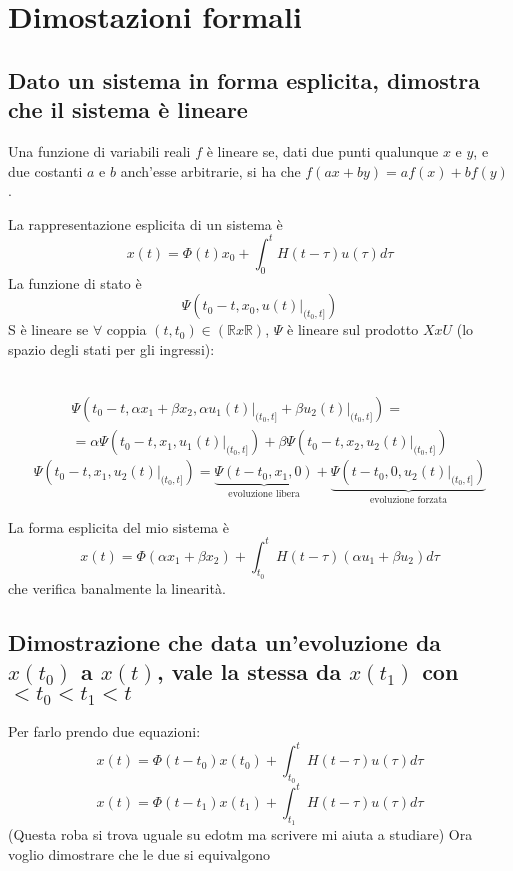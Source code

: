 \documentclass{article}
\begin{document}
\section{Dimostazioni formali}

\subsection{Dato un sistema in forma esplicita, dimostra che il sistema è lineare}
Una funzione di variabili reali $f$ è lineare se, dati due punti qualunque
$x$ e $y$, e due costanti $a$ e $b$ anch'esse arbitrarie, si ha che $f(ax+by)=af(x)+bf(y)$.

La rappresentazione esplicita di un sistema è 
\[ x(t) = \Phi(t)x_0 +\int_{0}^{t} H(t-\tau) u(\tau) d \tau
\]
La funzione di stato è
\[ \Psi \left(t_0-t,x_0,\left.u(t)\right|_{(t_0,t]}\right) \]
S è lineare se $\forall$ coppia $(t,t_0) \in (\mathbb{R}x\mathbb{R})$, $\Psi$ è lineare sul prodotto $XxU$ 
(lo spazio degli stati per gli ingressi):

\
\begin{align*}
    \Psi \left(t_0-t,\alpha x_1+\beta x_2,\alpha\left.u_1(t)\right|_{(t_0,t]}+\beta\left.u_2(t)\right|_{(t_0,t]}\right) =\\
    = \alpha\Psi \left(t_0-t,x_1,\left.u_1(t)\right|_{(t_0,t]}\right)+\beta\Psi \left(t_0-t,x_2,\left.u_2(t)\right|_{(t_0,t]}\right)
\end{align*}
\[
    \Psi \left(t_0-t,x_1,\left.u_2(t)\right|_{(t_0,t]}\right)  = \underbrace{\Psi\left(t-t_0,x_1,0\right)}_{\text{evoluzione libera}}+
    \underbrace{\Psi\left(t-t_0,0,\left.u_2(t)\right|_{(t_0,t]}\right)}_{\text{evoluzione forzata}}
\]

La forma esplicita del mio sistema è 
\[
x(t) = \Phi(\alpha x_1+\beta x_2) + \int_{t_0}^{t} H(t-\tau)(\alpha u_1 +\beta u_2)d\tau    
\]
che verifica banalmente la linearità.


\subsection{\boldmath Dimostrazione che data un'evoluzione da $x(t_0)$ a $x(t)$, vale la stessa da $x(t_1)$ con $<t_0<t_1<t$}
Per farlo prendo due equazioni:
\begin{equation}
    x(t) = \Phi(t-t_0)x(t_0)+\int_{t_0}^{t} H(t-\tau)u(\tau)d\tau
\end{equation}
\begin{equation}
    x(t) = \Phi(t-t_1)x(t_1)+\int_{t_1}^{t} H(t-\tau)u(\tau)d\tau
\end{equation}
(Questa roba si trova uguale su edotm ma scrivere mi aiuta a studiare)
Ora voglio dimostrare che le due si equivalgono
\end{document}
